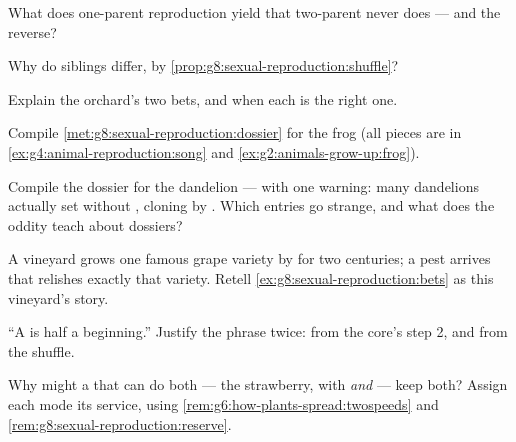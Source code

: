 \begin{exercise}[$\star$]\label{exo:g8:sexual-reproduction:5}
What does one-parent reproduction yield that two-parent
never does --- and the reverse?
\end{exercise}

\begin{exercise}[$\star$]\label{exo:g8:sexual-reproduction:6}
Why do siblings differ, by
\cref{prop:g8:sexual-reproduction:shuffle}?
\end{exercise}

\begin{exercise}[$\star\star$]\label{exo:g8:sexual-reproduction:7}
Explain the orchard's two bets, and when each is the
right one.
\end{exercise}

\begin{exercise}[$\star\star$]\label{exo:g8:sexual-reproduction:8}
Compile \cref{met:g8:sexual-reproduction:dossier} for
the frog (all pieces are in
\cref{ex:g4:animal-reproduction:song} and
\cref{ex:g2:animals-grow-up:frog}).
\end{exercise}

\begin{exercise}[$\star\star$]\label{exo:g8:sexual-reproduction:9}
Compile the dossier for the dandelion --- with one
warning: many dandelions actually set  without
, cloning by . Which entries go
strange, and what does the oddity teach about
dossiers?
\end{exercise}

\begin{exercise}[$\star\star$]\label{exo:g8:sexual-reproduction:10}
A vineyard grows one famous grape variety by 
for two centuries; a pest arrives that relishes exactly
that variety. Retell
\cref{ex:g8:sexual-reproduction:bets} as this
vineyard's story.
\end{exercise}

\begin{exercise}[$\star\star$]\label{exo:g8:sexual-reproduction:11}
``A  is half a beginning.'' Justify the phrase
twice: from the core's step 2, and from the shuffle.
\end{exercise}

\begin{exercise}[$\star\star\star$]\label{exo:g8:sexual-reproduction:12}
Why might a  that can do both --- the strawberry,
with  \emph{and}  --- keep both? Assign
each mode its service, using
\cref{rem:g6:how-plants-spread:twospeeds} and
\cref{rem:g8:sexual-reproduction:reserve}.
\end{exercise}

